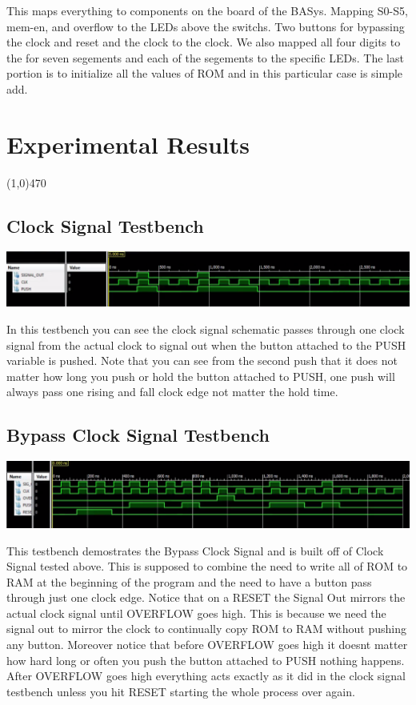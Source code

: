 \documentclass[12pt]{article}
\begin{document}
	This maps everything to components on the board of the BASys. Mapping S0-S5, mem-en, and overflow to the LEDs above the switchs. Two buttons for bypassing the clock and reset and the clock to the clock. We also mapped all four digits to the for seven segements and each of the segements to the specific LEDs. The last portion is to initialize all the values of ROM and in this particular case is simple add.

\newpage			
\section{Experimental Results}\vspace{-.7cm} \line(1,0){470}
	\subsection{Clock Signal Testbench}
		\begin{center}
			\includegraphics[scale=.4]{signal.PNG}\\
		\end{center}

		In this testbench you can see the clock signal schematic passes through one clock signal from the actual clock to signal out when the button attached to the PUSH variable is pushed. Note that you can see from the second push that it does not matter how long you push or hold the button attached to PUSH, one push will always pass one rising and fall clock edge not matter the hold time.

	\subsection{Bypass Clock Signal Testbench}
		\begin{center}
			\includegraphics[scale=.4]{bypass.PNG}\\
		\end{center}

		This testbench demostrates the Bypass Clock Signal and is built off of Clock Signal tested above. This is supposed to combine the need to write all of ROM to RAM at the beginning of the program and the need to have a button pass through just one clock edge. Notice that on a RESET the Signal Out mirrors the actual clock signal until OVERFLOW goes high. This is because we need the signal out to mirror the clock to continually copy ROM to RAM without pushing any button. Moreover notice that before OVERFLOW goes high it doesnt matter how hard long or often you push the button attached to PUSH nothing happens. After OVERFLOW goes high everything acts exactly as it did in the clock signal testbench unless you hit RESET starting the whole process over again.
\end{document}
